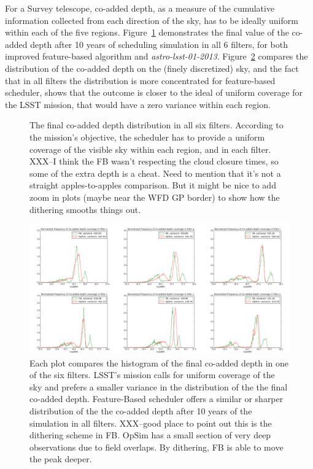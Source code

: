 \documentclass[12pt]{aastex62}
\theoremstyle{definition}
\begin{document}
For a Survey telescope, co-added depth, as a measure of the cumulative information collected from each direction of the sky, has to be ideally uniform within each of the five regions. Figure~\ref{fig_10yrs_skymap} demonstrates the final value of the co-added depth after 10 years of scheduling simulation in all 6 filters, for both improved feature-based algorithm and \textit{astro-lsst-01-2013}. Figure~\ref{fig_10yrs_hist} compares the distribution of the co-added depth on the (finely discretized) sky, and the fact that in all filters the distribution is more concentrated for feature-based scheduler, shows that the outcome is closer to the ideal of uniform coverage for the LSST mission, that would have a zero variance within each region.



\begin{figure}[h!]
\caption{The final co-added depth distribution in all six filters. According to the mission's objective, the scheduler has to provide a uniform coverage of the visible sky within each region, and in each filter. XXX--I think the FB wasn't respecting the cloud closure times, so some of the extra depth is a cheat. Need to mention that it's not a straight apples-to-apples comparison. But it might be nice to add zoom in plots (maybe near the WFD GP border) to show how the dithering smooths things out.}
\label{fig_10yrs_skymap}
\end{figure}

\begin{figure}[h!]
\includegraphics[width=.9\linewidth]{Figures/Co_addedHist10yrs.png}
\caption{Each plot compares the histogram of the final co-added depth in one of the six filters. LSST's mission calls for uniform coverage of the sky and prefers a smaller variance in the distribution of the the final co-added depth. Feature-Based scheduler offers a similar or sharper distribution of the the co-added depth after 10 years of the simulation in all filters. XXX--good place to point out this is the dithering scheme in FB. OpSim has a small section of very deep observations due to field overlaps. By dithering, FB is able to move the peak deeper.}
\label{fig_10yrs_hist}
\end{figure}
\end{document}
